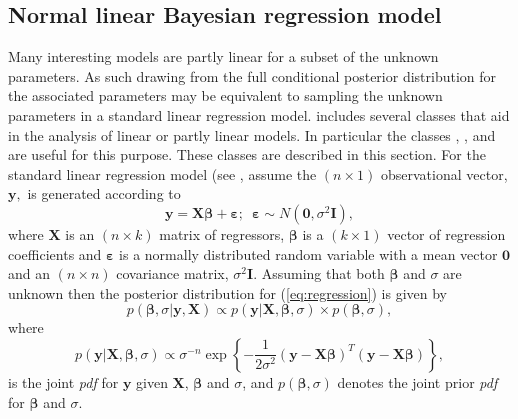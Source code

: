 \documentclass[article]{jss}
\begin{document}
\subsection{Normal linear Bayesian regression model}
\label{sec: Regression Model}

Many interesting models are partly linear for a subset of the unknown
parameters. As such drawing from the full conditional posterior
distribution for the associated parameters may be equivalent to
sampling the unknown parameters in a standard linear regression model.
 includes several classes that aid in the analysis of
linear or partly linear models. In particular the classes
, ,
 and  are useful for
this purpose. These classes are described in this section.  For the
standard linear regression model (see \citet{Zellner1971}, assume the
$\left(n\times1\right)$ observational vector, $\bm{y},$ is generated
according to\begin{equation}
  \bm{y}=\bm{X}\bm{\beta}+\bm{\varepsilon};\,\,\,\bm{\varepsilon}\sim
  N(\bm{0},\sigma^{2}\bm{I}),\label{eq:regression}
\end{equation} where
$\bm{X}$ is an $(n\times k)$ matrix of regressors, $\bm{\beta}$ is a
$\left(k\times1\right)$ vector of regression coefficients and
$\bm{\varepsilon}$ is a normally distributed random variable with a
mean vector $\bm{0}$ and an $\left(n\times n\right)$ covariance
matrix, $\sigma^{2}\bm{I}.$ Assuming that both $\bm{\beta}$ and
$\sigma$ are unknown then the posterior distribution for
(\ref{eq:regression}) is given by\begin{equation}
  p(\bm{\beta},\sigma|\bm{y},\bm{X})\propto
  p(\bm{y}|\bm{X},\bm{\beta},\sigma)\times
  p(\bm{\beta},\sigma),\label{eq:post regression}
\end{equation} where
\begin{equation}
  p(\bm{y}|\bm{X},\bm{\beta},\sigma)\propto\sigma^{-n}\exp\left\{
    -\frac{1}{2\sigma^{2}}\left(\bm{y}-\bm{X}\bm{\beta}\right)^{T}\left(\bm{y}-\bm{X}\bm{\beta}\right)\right\}
  ,\label{eq:likelihood regression}
\end{equation} is the joint
\emph{pdf} for $\bm{y}$ given $\bm{X}$, $\bm{\beta}$ and
$\sigma$, and\emph{ $p(\bm{\beta},\sigma)$ } denotes the joint
prior \emph{pdf} for $\bm{\beta}$ and $\sigma$.
\end{document}
